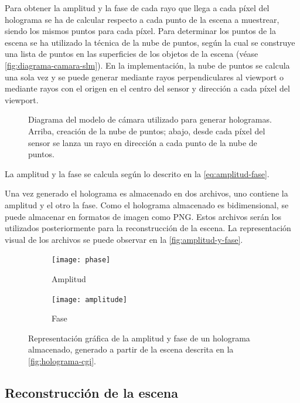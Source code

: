 \documentclass[10pt, a4paper]{article}
\begin{document}
Para obtener la amplitud y la fase de cada rayo que llega a cada píxel del holograma se ha de calcular respecto a cada punto de la escena a muestrear, siendo los mismos puntos para cada píxel. Para determinar los puntos de la escena se ha utilizado la técnica de la nube de puntos, según la cual se construye una lista de puntos en las superficies de los objetos de la escena (véase \autoref{fig:diagrama-camara-slm}). En la implementación, la nube de puntos se calcula una sola vez y se puede generar mediante rayos perpendiculares al viewport o mediante rayos con el origen en el centro del sensor y dirección a cada píxel del viewport.

\begin{figure}[H]
    \centering 
    
    \caption{Diagrama del modelo de cámara utilizado para generar hologramas. Arriba, creación de la nube de puntos; abajo, desde cada píxel del sensor se lanza un rayo en dirección a cada punto de la nube de puntos.}
    \label{fig:diagrama-camara-slm}
\end{figure}

La amplitud y la fase se calcula según lo descrito en la \autoref{eq:amplitud-fase}.

Una vez generado el holograma es almacenado en dos archivos, uno contiene la amplitud y el otro la fase. Como el holograma almacenado es bidimensional, se puede almacenar en formatos de imagen como PNG. Estos archivos serán los utilizados posteriormente para la reconstrucción de la escena. La representación visual de los archivos se puede observar en la \autoref{fig:amplitud-y-fase}.

\begin{figure}[H]
\centering
    \begin{subfigure}{1\textwidth}
        \texttt{[image: phase]}
        \caption{Amplitud}
        \label{fig:amplitud-y-fase-a}
    \end{subfigure}
    \begin{subfigure}{1\textwidth}
        \texttt{[image: amplitude]}
        \caption{Fase}
        \label{fig:amplitud-y-fase-b}
    \end{subfigure}
    \caption{Representación gráfica de la amplitud y fase de un holograma almacenado, generado a partir de la escena descrita en la \autoref{fig:holograma-cgi}.}
    \label{fig:amplitud-y-fase}
\end{figure}

\subsection{Reconstrucción de la escena}
\end{document}
